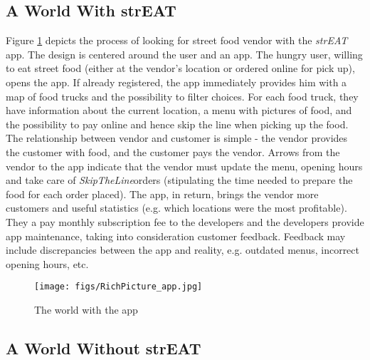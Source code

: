 \subsection{A World With strEAT}

Figure \ref{Richpicture} depicts the process of looking for street food vendor with the \textit{strEAT} app. The design is centered around the user and an app. The hungry user, willing to eat street food (either at the vendor's location or ordered online for pick up), opens the app. If already registered, the app immediately provides him with a map of food trucks and the possibility to filter choices. For each food truck, they have information about the current location, a menu with pictures of food, and the possibility to pay online and hence skip the line when picking up the food. The relationship between vendor and customer is simple - the vendor provides the customer with food, and the customer pays the vendor. Arrows from the vendor to the app indicate that the vendor must update the menu, opening hours and take care of \textit{SkipTheLine}\texttrademark orders (stipulating the time needed to prepare the food for each order placed). The app, in return, brings the vendor more customers and useful statistics (e.g. which locations were the most profitable). They a pay monthly subscription fee to the developers and the developers provide app maintenance, taking into consideration customer feedback. Feedback may include discrepancies between the app and reality, e.g. outdated menus, incorrect opening hours, etc.

\begin{figure}[h!]
  \centering
  \texttt{[image: figs/RichPicture\_app.jpg]}
  \caption{The world with the app}
  \label{Richpicture}
\end{figure}



\pagebreak


\subsection{A World Without strEAT}

